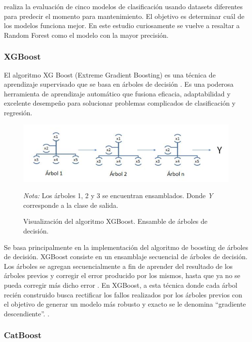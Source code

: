 \documentclass[11pt,a4paper,spanish]{book}
\numberwithin{equation}{chapter}
\numberwithin{figure}{chapter}
\begin{document}
\cite{sharma2022predictive} realiza la evaluación de cinco modelos de clasificación 
usando datasets diferentes para predecir el momento para mantenimiento. 
El objetivo es determinar cuál de los modelos funciona mejor. En este estudio 
curiosamente se vuelve a resaltar a Random Forest como el modelo con la mayor precisión.


\subsubsection{XGBoost}

El algoritmo XG Boost (Extreme Gradient Boosting) es una técnica de aprendizaje 
supervisado que se basa en árboles de decisión \cite{chen2016xgboost}. 
Es una poderosa herramienta de aprendizaje automático que fusiona eficacia, 
adaptabilidad y excelente desempeño para solucionar problemas complicados de 
clasificación y regresión. 

\begin{figure}[h]
    \caption{Visualización del algoritmo XGBoost. Ensamble de árboles de decisión.
    \protect\cite{salman2024rf}}
    \centering
    \includegraphics[width=1.0\textwidth]{media/xgboost-salman.png}
    \label{fig:figXGBoostSalman}
	\parbox{\textwidth}{\footnotesize \textit{Nota:} Los árboles 1, 2 y 3 se encuentran 
	ensamblados. Donde \textit{Y} corresponde a la clase de salida.}
\end{figure}


Se basa principalmente en la implementación del algoritmo de boosting de árboles de 
decisión. XGBoost consiste en un ensamblaje secuencial de árboles de decisión. 
Los árboles se agregan secuencialmente a fin de aprender del resultado de los árboles 
previos y corregir el error producido por los mismos, hasta que ya no se pueda corregir 
más dicho error \cite{salman2024rf}.  En XGBoost, a esta técnica donde cada árbol recién 
construido busca rectificar los fallos realizados por los árboles previos con el 
objetivo de generar un modelo más robusto y exacto se le denomina “gradiente 
descendiente”. \cite{espinoza2020rf_xgboost}.


\subsubsection{CatBoost}
\end{document}
